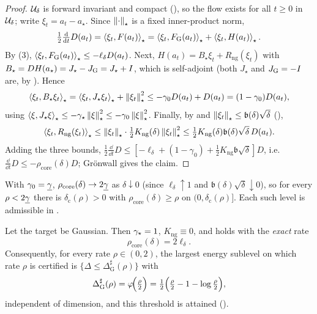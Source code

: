 \begin{proof}
$\mathcal{U}_\delta$ is forward invariant and compact (), so the flow
exists for all $t\geq0$ in $\mathcal{U}_\delta$; write $\xi_t=a_t-a_\star$. Since $\left\lVert \cdot\right\rVert_\star$
is a fixed inner-product norm,
\[
    \tfrac12\tfrac{\mathrm{d}}{\mathrm{d} t}D(a_t)
    =\left\langle \xi_t,F(a_t)\right\rangle_\star
    =\left\langle \xi_t,F_{\mathrm G}(a_t)\right\rangle_\star+\left\langle \xi_t,H(a_t)\right\rangle_\star .
\]
By (3), $\left\langle \xi_t,F_{\mathrm G}(a_t)\right\rangle_\star\leq-\ell_\delta D(a_t)$.
Next, $H(a_t)=B_\star\xi_t+R_{\mathrm{ng}}(\xi_t)$ with $B_\star=DH(a_\star)=J_\star-J_{\mathrm G}=J_\star+I$,
which is self-adjoint (both $J_\star$ and $J_{\mathrm G}=-I$ are, by
). Hence
\[
    \left\langle \xi_t,B_\star\xi_t\right\rangle_\star
    =\left\langle \xi_t,J_\star\xi_t\right\rangle_\star+\left\lVert \xi_t\right\rVert_\star^2
    \leq-\gamma_0 D(a_t)+D(a_t)=(1-\gamma_0)D(a_t),
\]
using $\left\langle \xi,J_\star\xi\right\rangle_\star\leq-\gamma_\star\left\lVert \xi\right\rVert_\star^2\leq-\gamma_0\left\lVert \xi\right\rVert_\star^2$.
Finally, by  and $\left\lVert \xi_t\right\rVert_\star\leq\mathfrak b(\delta)\sqrt\delta$
(),
\[
    \left\langle \xi_t,R_{\mathrm{ng}}(\xi_t)\right\rangle_\star
    \leq\left\lVert \xi_t\right\rVert_\star\cdot\tfrac12K_{\mathrm{ng}}(\delta)\left\lVert \xi_t\right\rVert_\star^2
    \leq\tfrac12K_{\mathrm{ng}}(\delta)\mathfrak b(\delta)\sqrt\delta\,D(a_t).
\]
Adding the three bounds,
$\tfrac12\tfrac{\dd}{\dd t}D\leq[-\ell_\delta+(1-\gamma_0)+\tfrac12K_{\mathrm{ng}}\mathfrak b\sqrt\delta]D$,
i.e.\ $\tfrac{\dd}{\dd t}D\leq-\rho_{\mathrm{core}}(\delta)D$; Gr\"onwall gives the claim.
\end{proof}

\begin{corollary}
\label{cor:core-universal}
With $\gamma_0=\underline{\gamma}$, $\rho_{\mathrm{core}}(\delta)\to2\underline{\gamma}$ as $\delta\downarrow0$
(since $\ell_\delta\uparrow1$ and $\mathfrak b(\delta)\sqrt\delta\downarrow0$), so for every
$\rho<2\underline{\gamma}$ there is $\delta_{\mathrm c}(\rho)>0$ with $\rho_{\mathrm{core}}(\delta)\geq\rho$
on $(0,\delta_{\mathrm c}(\rho)]$. Each such level is admissible in .
\end{corollary}

\begin{corollary}
\label{cor:gauss-sharp}
Let the target be Gaussian. Then $\gamma_\star=1$, $K_{\mathrm{ng}}\equiv0$, and 
holds with the \emph{exact} rate
\[
    \rho_{\mathrm{core}}(\delta)=2\ell_\delta .
\]
Consequently, for every rate $\rho\in(0,2)$, the largest energy sublevel on which rate
$\rho$ is certified is $\{\Delta\leq\Delta_{\mathrm G}^\sharp(\rho)\}$ with
\begin{equation}
\label{eq:gauss-sharp-thresh}
    \Delta_{\mathrm G}^\sharp(\rho)=\varphi\!\Bigl(\tfrac\rho2\Bigr)=\tfrac12\Bigl(\tfrac\rho2-1-\log\tfrac\rho2\Bigr),
\end{equation}
independent of dimension, and this threshold is attained ().
\end{corollary}

